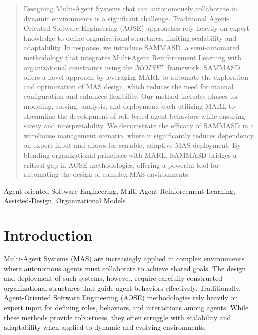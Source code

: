 \documentclass[conference]{IEEEtran}
\begin{document}
\maketitle

\begin{abstract}
    Designing Multi-Agent Systems that can autonomously collaborate in dynamic environments is a significant challenge. Traditional Agent-Oriented Software Engineering (AOSE) approaches rely heavily on expert knowledge to define organizational structures, limiting scalability and adaptability. In response, we introduce SAMMASD, a semi-automated methodology that integrates Multi-Agent Reinforcement Learning with organizational constraints using the $\mathcal{M}OISE^+$ framework. SAMMASD offers a novel approach by leveraging MARL to automate the exploration and optimization of MAS design, which reduces the need for manual configuration and enhances flexibility. Our method includes phases for modeling, solving, analysis, and deployment, each utilizing MARL to streamline the development of role-based agent behaviors while ensuring safety and interpretability. We demonstrate the efficacy of SAMMASD in a warehouse management scenario, where it significantly reduces dependency on expert input and allows for scalable, adaptive MAS deployment. By blending organizational principles with MARL, SAMMASD bridges a critical gap in AOSE methodologies, offering a powerful tool for automating the design of complex MAS environments.
\end{abstract}

\begin{IEEEkeywords}
    Agent-oriented Software Engineering, Multi-Agent Reinforcement Learning, Assisted-Design, Organizational Models
\end{IEEEkeywords}


\section{Introduction}

Multi-Agent Systems (MAS) are increasingly applied in complex environments where autonomous agents must collaborate to achieve shared goals. The design and deployment of such systems, however, require carefully constructed organizational structures that guide agent behaviors effectively. Traditionally, Agent-Oriented Software Engineering (AOSE) methodologies rely heavily on expert input for defining roles, behaviors, and interactions among agents. While these methods provide robustness, they often struggle with scalability and adaptability when applied to dynamic and evolving environments.
\end{document}
